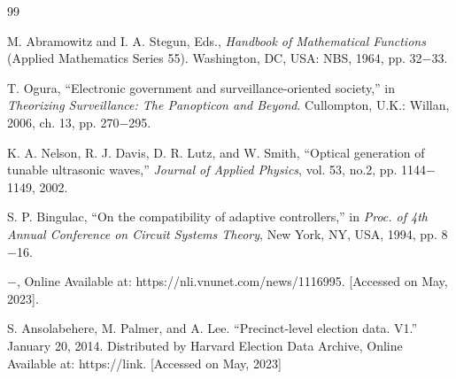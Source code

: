 \documentclass[12pt, a4paper, oneside, openright]{Thesis} %
\begin{document}
\clearpage %


\appendix %


%
% 
%




\label{References}

\renewcommand\bibname{References}
\begin{thebibliography}{99}

M. Abramowitz and I. A. Stegun, Eds., \textit{Handbook of Mathematical Functions} (Applied Mathematics Series 55). Washington, DC, USA: NBS, 1964, pp. 32$-$33.


 T. Ogura, “Electronic government and surveillance-oriented society,” in \emph{Theorizing Surveillance: The Panopticon and Beyond}. Cullompton, U.K.: Willan, 2006, ch. 13, pp. 270$-$295.


K. A. Nelson, R. J. Davis, D. R. Lutz, and W. Smith, “Optical generation of
tunable ultrasonic waves,” \textit{Journal of Applied Physics}, vol. 53, no.2, pp. 1144$-$1149, 2002.


S. P. Bingulac, “On the compatibility of adaptive controllers,” in \textit{Proc. of 4th Annual Conference on Circuit Systems Theory}, New York, NY, USA, 1994, pp. 8$-$16.

$-$, Online Available at: https://nli.vnunet.com/news/1116995. [Accessed on May, 2023].


S. Ansolabehere, M. Palmer, and A. Lee. “Precinct-level election data. V1.” January 20, 2014. Distributed by Harvard Election Data Archive, Online Available at: https://link. [Accessed on May, 2023] 

\end{thebibliography}
\end{document}
